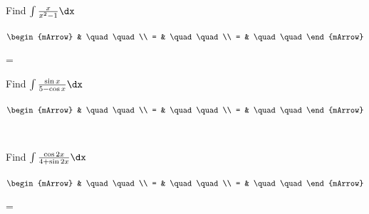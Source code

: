\clearpage
\begin{mtask}[resume]
   \task \begin{exercise} Find $\int \frac{x}{x^2-1} \dx$
           \begin{envSolution}
             $\begin{mArrow}
                   & \quad \quad              \\
		   		 = & \quad \quad              \\
				 = & \quad \quad 
              \end{mArrow}$
            \begin{shortsolution}  
			     =$ \quad \quad \quad \quad$
			\end{shortsolution}				 
           \end{envSolution}
         \end{exercise}   
		 
    \task \begin{exercise} Find $\int \frac{\sin x}{5-\cos x} \dx $
           \begin{envSolution}
             $\begin{mArrow}
                   & \quad \quad              \\
		   		 = & \quad \quad               \\
				 = & \quad \quad 
              \end{mArrow}$  
           \end{envSolution}  
           \begin{shortsolution}  
			           $ \quad \quad \quad \quad $
		      	 \end{shortsolution}
           \end{exercise}

   \task \begin{exercise} Find $\int \frac{\cos 2x}{4+\sin {2x}} \dx$
           \begin{envSolution}
             $\begin{mArrow}
                   & \quad \quad              \\
		   		 = & \quad \quad              \\
				 = & \quad \quad 
              \end{mArrow}$
            \begin{shortsolution}  
			     =$ \quad \quad \quad \quad$
			\end{shortsolution}				 
           \end{envSolution}
         \end{exercise}


\end{mtask}
